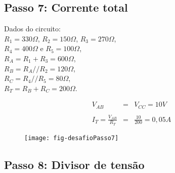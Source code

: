 \subsection{Passo 7: Corrente total}

\begin{minipage}{\linewidth}
  \centering
  \begin{minipage}{0.45\linewidth}
    Dados do circuito: \\
                $R_1 = 330\Omega$,
                $R_2 = 150\Omega$,
                $R_3 = 270\Omega$, \\
                $R_4 = 400\Omega$ e
                $R_5 = 100\Omega$,\\
                $R_A = R_1 + R_3 = 600\Omega$, \\
                $R_B = R_A // R_2 = 120\Omega$, \\
                $R_C = R_4 // R_5 = 80\Omega$, \\
                $R_T = R_B + R_C = 200\Omega$.

                \begin{eqnarray}
                  V_{AB} & = & V_{CC} = 10 V \nonumber\\
                  \nonumber\\
                  I_T = \frac{V_{AB}}{R_T} & = & \frac{10}{200} = 0,05 A \nonumber
                \end{eqnarray}
  \end{minipage}
  \hspace{0.05\linewidth}
  \begin{minipage}{0.45\linewidth}
    \begin{figure}[H]
      \centering
      \texttt{[image: fig-desafioPasso7]}
    \end{figure}
  \end{minipage}
\end{minipage}





\subsection{Passo 8: Divisor de tensão}

